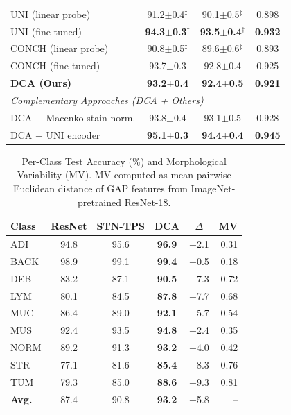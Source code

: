 \documentclass[pdflatex,sn-nature]{sn-jnl}%
\theoremstyle{thmstyleone}%
\theoremstyle{thmstyletwo}%
\theoremstyle{thmstylethree}%
\begin{document}
\begin{table}[t]
\begin{tabularx}{\textwidth}{Xccc}
UNI (linear probe) & 91.2$\pm$0.4$^\ddagger$ & 90.1$\pm$0.5$^\ddagger$ & 0.898 \\
UNI (fine-tuned) & \textbf{94.3$\pm$0.3}$^\dagger$ & \textbf{93.5$\pm$0.4}$^\dagger$ & \textbf{0.932} \\
CONCH (linear probe) & 90.8$\pm$0.5$^\ddagger$ & 89.6$\pm$0.6$^\ddagger$ & 0.893 \\
CONCH (fine-tuned) & 93.7$\pm$0.3 & 92.8$\pm$0.4 & 0.925 \\
\hline
\textbf{DCA (Ours)} & \textbf{93.2$\pm$0.4} & \textbf{92.4$\pm$0.5} & \textbf{0.921} \\
\hline
\multicolumn{4}{l}{\textit{Complementary Approaches (DCA + Others)}} \\
DCA + Macenko stain norm. & 93.8$\pm$0.4 & 93.1$\pm$0.5 & 0.928 \\
DCA + UNI encoder & \textbf{95.1$\pm$0.3} & \textbf{94.4$\pm$0.4} & \textbf{0.945} \\
\hline
\end{tabularx}
\end{table}
\begin{table}[t]
\centering
\caption{Per-Class Test Accuracy (\%) and Morphological Variability (MV). MV computed as mean pairwise Euclidean distance of GAP features from ImageNet-pretrained ResNet-18.}
\label{tab:per_class}
\begin{tabularx}{\textwidth}{Xccccr}
\hline
\textbf{Class} & \textbf{ResNet} & \textbf{STN-TPS} & \textbf{DCA} & \textbf{$\Delta$} & \textbf{MV} \\
\hline
ADI & 94.8 & 95.6 & \textbf{96.9} & +2.1 & 0.31 \\
BACK & 98.9 & 99.1 & \textbf{99.4} & +0.5 & 0.18 \\
DEB & 83.2 & 87.1 & \textbf{90.5} & +7.3 & 0.72 \\
LYM & 80.1 & 84.5 & \textbf{87.8} & +7.7 & 0.68 \\
MUC & 86.4 & 89.0 & \textbf{92.1} & +5.7 & 0.54 \\
MUS & 92.4 & 93.5 & \textbf{94.8} & +2.4 & 0.35 \\
NORM & 89.2 & 91.3 & \textbf{93.2} & +4.0 & 0.42 \\
STR & 77.1 & 81.6 & \textbf{85.4} & +8.3 & 0.76 \\
TUM & 79.3 & 85.0 & \textbf{88.6} & +9.3 & 0.81 \\
\hline
\textbf{Avg.} & 87.4 & 90.8 & \textbf{93.2} & +5.8 & -- \\
\hline
\end{tabularx}
\end{table}
\end{document}
